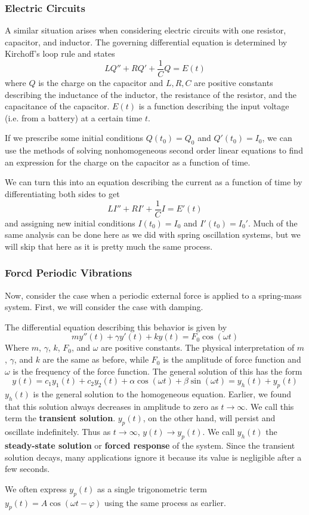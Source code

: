 \subsubsection{Electric Circuits}
A similar situation arises when considering electric circuits with one resistor, capacitor, and inductor. The governing differential equation is determined by Kirchoff's loop rule and states
\[ LQ'' + RQ' + \frac{1}{C}Q = E(t) \]
where $Q$ is the charge on the capacitor and $L, R, C$ are positive constants describing the inductance of the inductor, the resistance of the resistor, and the capacitance of the capacitor. $E(t)$ is a function describing the input voltage (i.e. from a battery) at a certain time $t$. \par
If we prescribe some initial conditions $Q(t_0) = Q_0$ and $Q'(t_0) = I_0$, we can use the methods of solving nonhomogeneous second order linear equations to find an expression for the charge on the capacitor as a function of time. \par
We can turn this into an equation describing the current as a function of time by differentiating both sides to get
\[ LI'' + RI' + \frac{1}{C}I = E'(t) \]
and assigning new initial conditions $I(t_0) = I_0$ and $I'(t_0) = I_0'$. Much of the same analysis can be done here as we did with spring oscillation systems, but we will skip that here as it is pretty much the same process.
\subsubsection{Forcd Periodic Vibrations}
Now, consider the case when a periodic external force is applied to a spring-mass system. First, we will consider the case with damping. \par
The differential equation describing this behavior is given by
\[ my''(t) + \gamma y'(t) + ky(t) = F_0\cos(\omega t) \]
Where $m$, $\gamma$, $k$, $F_0$, and $\omega$ are positive constants. The physical interpretation of $m$, $\gamma$, and $k$ are the same as before, while $F_0$ is the amplitude of force function and $\omega$ is the frequency of the force function. The general solution of this has the form
\[ y(t) = c_1y_1(t) + c_2y_2(t) + \alpha \cos(\omega t) + \beta \sin(\omega t) = y_h(t) + y_p(t) \]
$y_h(t)$ is the general solution to the homogeneous equation. Earlier, we found that this solution always decreases in amplitude to zero as $t\to\infty$. We call this term the \textbf{transient solution}. $y_p(t)$, on the other hand, will persist and oscillate indefinitely. Thus as $t\to\infty$, $y(t) \to y_p(t)$. We call $y_h(t)$ the \textbf{steady-state solution} or \textbf{forced response} of the system. Since the transient solution decays, many applications ignore it because its value is negligible after a few seconds. \par
We often express $y_p(t)$ as a single trigonometric term $y_p(t) = A\cos(\omega t - \varphi)$ using the same process as earlier. 
